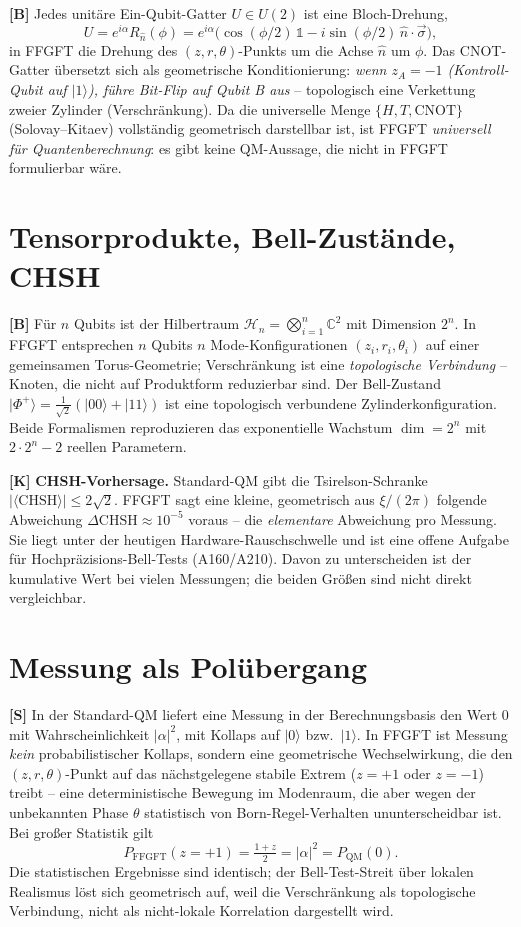 \textbf{[B]} Jedes unitäre Ein-Qubit-Gatter $U\in U(2)$ ist eine
Bloch-Drehung,
\[
  U = e^{i\alpha}R_{\hat n}(\phi)
    = e^{i\alpha}\bigl(\cos(\phi/2)\,\mathbb{1} - i\sin(\phi/2)\,\hat n\cdot\vec\sigma\bigr),
\]
in FFGFT die Drehung des $(z,r,\theta)$-Punkts um die Achse $\hat n$ um $\phi$.
Das CNOT-Gatter übersetzt sich als geometrische Konditionierung: \emph{wenn
$z_A=-1$ (Kontroll-Qubit auf $|1\rangle$), führe Bit-Flip auf Qubit B aus} --
topologisch eine Verkettung zweier Zylinder (Verschränkung). Da die
universelle Menge $\{H,T,\text{CNOT}\}$ (Solovay--Kitaev) vollständig
geometrisch darstellbar ist, ist FFGFT \emph{universell für Quantenberechnung}:
es gibt keine QM-Aussage, die nicht in FFGFT formulierbar wäre.

\section{Tensorprodukte, Bell-Zustände, CHSH}

\textbf{[B]} Für $n$ Qubits ist der Hilbertraum
$\mathcal{H}_n = \bigotimes_{i=1}^n\mathbb{C}^2$ mit Dimension $2^n$. In FFGFT
entsprechen $n$ Qubits $n$ Mode-Konfigurationen $(z_i,r_i,\theta_i)$ auf einer
gemeinsamen Torus-Geometrie; Verschränkung ist eine \emph{topologische
Verbindung} -- Knoten, die nicht auf Produktform reduzierbar sind. Der Bell-Zustand
$|\Phi^+\rangle = \tfrac{1}{\sqrt2}(|00\rangle+|11\rangle)$ ist eine topologisch
verbundene Zylinderkonfiguration. Beide Formalismen reproduzieren das
exponentielle Wachstum $\dim = 2^n$ mit $2\cdot2^n-2$ reellen Parametern.

\textbf{[K]} \textbf{CHSH-Vorhersage.} Standard-QM gibt die Tsirelson-Schranke
$|\langle\text{CHSH}\rangle|\le 2\sqrt2$. FFGFT sagt eine kleine, geometrisch aus
$\xi/(2\pi)$ folgende Abweichung $\Delta\text{CHSH}\approx10^{-5}$ voraus -- die
\emph{elementare} Abweichung pro Messung. Sie liegt unter der heutigen
Hardware-Rauschschwelle und ist eine offene Aufgabe für Hochpräzisions-Bell-Tests
(A160/A210). Davon zu unterscheiden ist der kumulative Wert bei vielen Messungen;
die beiden Größen sind nicht direkt vergleichbar.

\section{Messung als Polübergang}

\textbf{[S]} In der Standard-QM liefert eine Messung in der Berechnungsbasis den
Wert $0$ mit Wahrscheinlichkeit $|\alpha|^2$, mit Kollaps auf $|0\rangle$ bzw.\
$|1\rangle$. In FFGFT ist Messung \emph{kein} probabilistischer Kollaps, sondern
eine geometrische Wechselwirkung, die den $(z,r,\theta)$-Punkt auf das
nächstgelegene stabile Extrem ($z=+1$ oder $z=-1$) treibt -- eine
deterministische Bewegung im Modenraum, die aber wegen der unbekannten Phase
$\theta$ statistisch von Born-Regel-Verhalten ununterscheidbar ist. Bei großer
Statistik gilt
\[
  P_{\text{FFGFT}}(z=+1) = \tfrac{1+z}{2} = |\alpha|^2 = P_{\text{QM}}(0).
\]
Die statistischen Ergebnisse sind identisch; der Bell-Test-Streit über lokalen
Realismus löst sich geometrisch auf, weil die Verschränkung als topologische
Verbindung, nicht als nicht-lokale Korrelation dargestellt wird.

